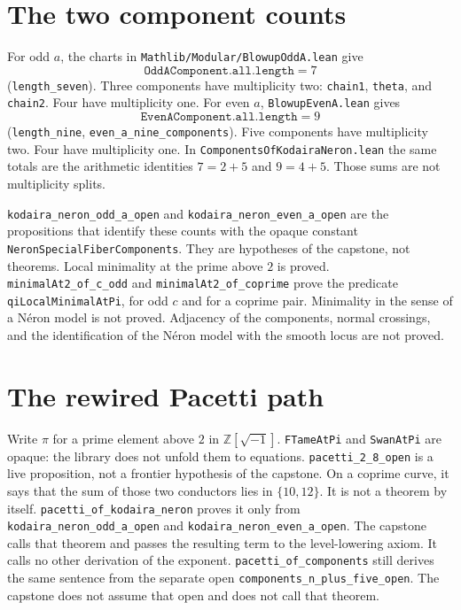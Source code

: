 \documentclass[11pt]{amsart}
\begin{document}
\section{The two component counts}
For odd $a$, the charts in \texttt{Mathlib/Modular/BlowupOddA.lean} give
\[
\texttt{OddAComponent.all.length} = 7
\]
(\texttt{length\_seven}).
Three components have multiplicity two: \texttt{chain1}, \texttt{theta}, and \texttt{chain2}.
Four have multiplicity one.
For even $a$, \texttt{BlowupEvenA.lean} gives
\[
\texttt{EvenAComponent.all.length} = 9
\]
(\texttt{length\_nine}, \texttt{even\_a\_nine\_components}).
Five components have multiplicity two.
Four have multiplicity one.
In \texttt{ComponentsOfKodairaNeron.lean} the same totals are the arithmetic identities $7=2+5$ and $9=4+5$.
Those sums are not multiplicity splits.

\texttt{kodaira\_neron\_odd\_a\_open} and \texttt{kodaira\_neron\_even\_a\_open} are the propositions that identify these counts with the opaque constant \texttt{NeronSpecialFiberComponents}.
They are hypotheses of the capstone, not theorems.
Local minimality at the prime above $2$ is proved.
\texttt{minimalAt2\_of\_c\_odd} and \texttt{minimalAt2\_of\_coprime} prove the predicate \texttt{qiLocalMinimalAtPi}, for odd $c$ and for a coprime pair.
Minimality in the sense of a N\'eron model is not proved.
Adjacency of the components, normal crossings, and the identification of the N\'eron model with the smooth locus are not proved.

\section{The rewired Pacetti path}
Write $\pi$ for a prime element above $2$ in $\mathbb Z[\sqrt{-1}]$.
\texttt{FTameAtPi} and \texttt{SwanAtPi} are opaque: the library does not unfold them to equations.
\texttt{pacetti\_2\_8\_open} is a live proposition, not a frontier hypothesis of the capstone.
On a coprime curve, it says that the sum of those two conductors lies in $\{10,12\}$.
It is not a theorem by itself.
\texttt{pacetti\_of\_kodaira\_neron} proves it only from \texttt{kodaira\_neron\_odd\_a\_open} and \texttt{kodaira\_neron\_even\_a\_open}.
The capstone calls that theorem and passes the resulting term to the level-lowering axiom.
It calls no other derivation of the exponent.
\texttt{pacetti\_of\_components} still derives the same sentence from the separate open \texttt{components\_n\_plus\_five\_open}.
The capstone does not assume that open and does not call that theorem.
\end{document}
